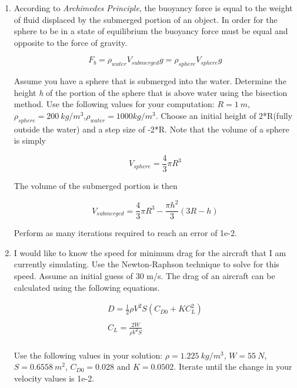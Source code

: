 \begin{enumerate}
\item According to {\it Archimedes Principle}, the buoyancy force is
  equal to the weight of fluid displaced by the submerged portion of
  an object. In order for the sphere to be in a state of equilibrium
  the buoyancy force must be equal and opposite to the force of
  gravity. 

  \begin{equation}
    F_b = \rho_{water}V_{submerged}g = \rho_{sphere}V_{sphere}g
  \end{equation}

  Assume you have a sphere that is submerged into the water. Determine
  the height {\it h} of the portion of the sphere that is above water
  using the bisection method. Use the following values for your
  computation: $R=1~m$,$\rho_{sphere}=200~kg/m^3$,$\rho_{water}=1000
  kg/m^3$. Choose an initial height of 2*R(fully outside the water)
  and a step size of -2*R. Note that the volume of a sphere is simply 

  \begin{equation}
    V_{sphere} = \frac{4}{3}\pi R^3
  \end{equation}

  The volume of the submerged portion is then

  \begin{equation}
    V_{submerged} = \frac{4}{3}\pi R^3 - \frac{\pi h^2}{3}(3R-h)
  \end{equation}

  Perform as many iterations required to reach an error of 1e-2.

\item I would like to know the speed for minimum drag for the aircraft
  that I am currently simulating. Use the Newton-Raphson technique to
  solve for this speed. Assume an initial guess of 30 m/s. The drag of
  an aircraft can be calculated using the following equations.

  \begin{equation}
    \begin{matrix}
      D = \frac{1}2\rho V^2 S(C_{D0} + KC_L^2) \\
      \ \\
      C_L = \frac{2W}{\rho V^2 S} \\
      \end{matrix}
  \end{equation}

  Use the following values in your solution: $\rho = 1.225~kg/m^3$,
  $W=55~N$, $S=0.6558~m^2$, $C_{D0} = 0.028$ and $K=0.0502$. Iterate
  until the change in your velocity values is 1e-2.


\end{enumerate}
